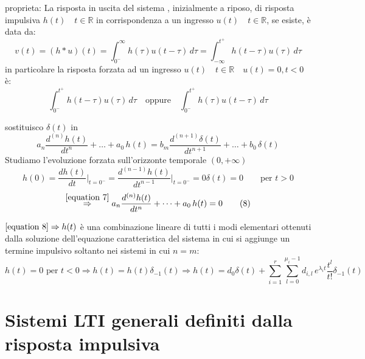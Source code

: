proprieta:
La risposta in uscita del sistema%
, inizialmente a riposo, di risposta impulsiva $h(t)\quad t\in\mathbb{R}$ in corrispondenza a un ingresso $u(t)\quad t\in\mathbb{R}$, se esiste, è data da:
\[
v(t)=(h*u)(t) = \int_{0^-}^{\infty}h(\tau)u(t - \tau)\,d\tau
= \int_{-\infty}^{t^+}h(t - \tau)u(\tau)\,d\tau
\]
in particolare la risposta forzata ad un ingresso $u(t)\quad t\in\mathbb{R} \quad u(t)=0 , t<0$ è:
\[
\int_{0^-}^{t^+}h(t - \tau)u(\tau)\,d\tau 
\quad\text{oppure}\quad
\int_{0^-}^{t^+}h(\tau)u(t - \tau)\,d\tau 
\]

sostituisco $\delta (t)$ in %
\begin{equation}
	a_n \frac{d^{(n)} h(t)}{dt^n}+\dots+a_0\,h(t) = b_m \frac{d^{(n+1)} \delta(t)}{dt^{n+1}}+\dots+b_0\,\delta(t) %
	\tag{7}\label{equation 7}
\end{equation}
Studiamo l'evoluzione forzata sull'orizzonte temporale $(0,+\infty)$ %
\[ %
	h(0) = \frac{dh(t)}{dt}\bigg\vert_{t=0^-}
	=\frac{d^{(n-1)}h(t)}{dt^{n-1}}\bigg\vert_{t=0^-}
	= 0
	\delta(t) = 0 \qquad\text{per } t>0
\]
\begin{equation}
	\overset{\eqref{equation 7}}{\Rightarrow}a_n \frac{d^{(n)} h(t)}{dt^n}+\dots+a_0\,h(t) = 0 
	\tag{8}\label{equation 8}
\end{equation}
	
\begin{oss}
	$\eqref{equation 8} \Rightarrow h (t)$ è una combinazione lineare di tutti i modi elementari ottenuti dalla soluzione dell'equazione caratteristica del sistema%
	in cui si aggiunge un termine impulsivo soltanto nei sistemi in cui $n=m$:
	\begin{equation}
		h(t)=0 \text{ per } t<0 \Rightarrow h(t) = h(t)\delta_{-1} (t)
		\Rightarrow h(t)= d_0 \delta(t) + \sum_{i=1}^{r}\sum_{l=0}^{\mu_i-1}d_{i,l} \,e^{\lambda_it}\frac{t^l}{t!}\delta_{-1} (t)
		\tag{9}\label{equation 9}
	\end{equation}
\end{oss}



\section{Sistemi LTI generali definiti dalla risposta impulsiva}

